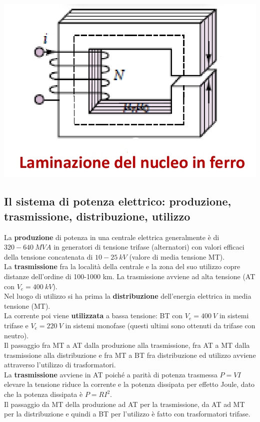 \documentclass{article}
\begin{document}
\begin{center}
    \includegraphics[scale=0.24]{Image/Laminazione_nucleo_ferro.png}
\end{center}


\subsection{Il sistema di potenza elettrico: produzione, trasmissione, distribuzione, utilizzo}
La \textbf{produzione} di potenza in una centrale elettrica generalmente è di $320-640 \ MVA$ in generatori di tensione trifase (alternatori) con valori efficaci della tensione concatenata di $10-25 \ kV$ (valore di media tensione MT).\\
La \textbf{trasmissione} fra la località della centrale e la zona del suo utilizzo copre distanze dell'ordine di 100-1000 km. La trasmissione avviene ad alta tensione (AT con $V_e = 400 \ kV$).\\
Nel luogo di utilizzo si ha prima la \textbf{distribuzione} dell'energia elettrica in media tensione (MT).\\
La corrente poi viene \textbf{utilizzata} a bassa tensione: BT con $V_e = 400 \ V$ in sistemi trifase
e $V_e = 220 \ V$ in sistemi monofase (questi ultimi sono ottenuti da trifase con neutro).\\
Il passaggio fra MT a AT dalla produzione alla trasmissione, fra AT a MT dalla trasmissione alla distribuzione e fra MT a BT fra distribuzione ed utilizzo avviene attraverso l'utilizzo di trasformatori.
\vspace*{0.2cm}\\
La \textbf{trasmissione} avviene in AT poiché a parità di potenza trasmessa $P=VI$ elevare la tensione riduce la corrente e la potenza dissipata per effetto Joule, dato che la potenza dissipata è $P= RI^2$.\\
Il passaggio da MT della produzione ad AT per la trasmissione, da AT ad MT per la distribuzione e quindi a BT per l'utilizzo è fatto con trasformatori trifase.
\end{document}
